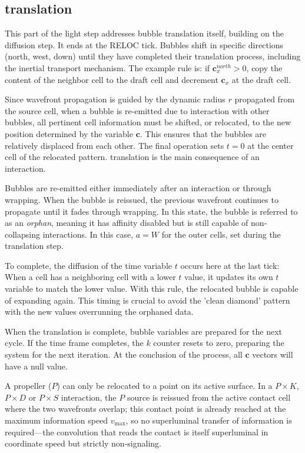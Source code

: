 \documentclass{ijuc}
\begin{document}
\subsection{translation} \label{subsec:translation}
This part of the light step addresses bubble translation itself, building on the diffusion step. 
It ends at the RELOC tick. Bubbles shift in specific directions (north, west, down) until they have completed their translation process, including the inertial transport mechanism. 
The example rule is: if $\textbf{c}_x^{north}>0$, copy the content of the neighbor cell to the draft cell and decrement $\textbf{c}_x$ at the draft cell.

Since wavefront propagation is guided by the dynamic radius $r$ propagated from the source cell, when a bubble is re-emitted due to interaction with other bubbles, all pertinent cell information must be shifted, or relocated, to the new position determined by the variable $\textbf{c}$. 
This ensures that the bubbles are relatively displaced from each other. 
The final operation sets $t=0$ at the center cell of the relocated pattern. 
translation is the main consequence of an interaction.

Bubbles are re-emitted either immediately after an interaction or through wrapping. 
When the bubble is reissued, the previous wavefront continues to propagate until it fades through wrapping. 
In this state, the bubble is referred to as an \textit{orphan}, meaning it has affinity disabled but is still capable of non-collapsing interactions. 
In this case, $a=W$ for the outer cells, set during the translation step. 

To complete, the diffusion of the time variable $t$ occurs here at the last tick: When a cell has a neighboring cell with a lower $t$ value, it updates its own $t$ variable to match the lower value. 
With this rule, the relocated bubble is capable of expanding again. 
This timing is crucial to avoid the 'clean diamond' pattern with the new values overrunning the orphaned data.

When the translation is complete, bubble variables are prepared for the next cycle. 
If the time frame completes, the $k$ counter resets to zero, preparing the system for the next iteration.  
At the conclusion of the process, all $\boldsymbol{c}$ vectors will have a null value.

A propeller ($P$) can only be relocated to a point on its active surface. In a $P \times K$, $P \times D$ or $P \times S$ interaction, the $P$ source is reissued from the active contact cell where the two wavefronts overlap; this contact point is already reached at the maximum information speed $v_{\max}$, so no superluminal transfer of information is required---the convolution that reads the contact is itself superluminal in coordinate speed but strictly non-signaling.
\end{document}
